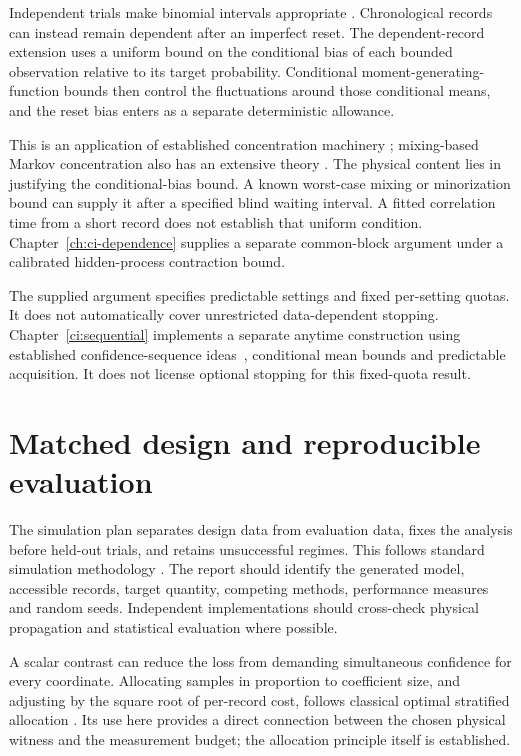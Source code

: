 Independent trials make binomial intervals appropriate
\cite{vlClopper1934}. Chronological records can instead remain dependent after
an imperfect reset. The dependent-record extension uses a uniform bound on the
conditional bias of each bounded observation relative to its target
probability. Conditional moment-generating-function bounds then control the
fluctuations around those conditional means, and the reset bias enters as a
separate deterministic allowance.

This is an application of established concentration machinery
\cite{caHoeffding1963,vlHoward2021}; mixing-based Markov concentration also has
an extensive theory \cite{vlPaulin2015}. The physical content lies in justifying
the conditional-bias bound. A known worst-case mixing or minorization bound can
supply it after a specified blind waiting interval. A fitted correlation time
from a short record does not establish that uniform condition.
Chapter~\ref{ch:ci-dependence} supplies a separate common-block argument
under a calibrated hidden-process contraction bound.

The supplied argument specifies predictable settings and fixed per-setting
quotas. It does not automatically cover unrestricted data-dependent stopping.
Chapter~\ref{ci:sequential} implements a separate anytime construction
using established confidence-sequence ideas~\cite{vlHoward2021}, conditional
mean bounds and predictable acquisition. It does not license optional
stopping for this fixed-quota result.

\section{Matched design and reproducible evaluation}

The simulation plan separates design data from evaluation data, fixes the
analysis before held-out trials, and retains unsuccessful regimes. This follows
standard simulation methodology \cite{vlMorris2019}. The report should identify
the generated model, accessible records, target quantity, competing methods,
performance measures and random seeds. Independent implementations should
cross-check physical propagation and statistical evaluation where possible.

A scalar contrast can reduce the loss from demanding simultaneous confidence
for every coordinate. Allocating samples in proportion to coefficient size,
and adjusting by the square root of per-record cost, follows classical optimal
stratified allocation \cite{vlCochran1977}. Its use here provides a direct
connection between the chosen physical witness and the measurement budget;
the allocation principle itself is established.

